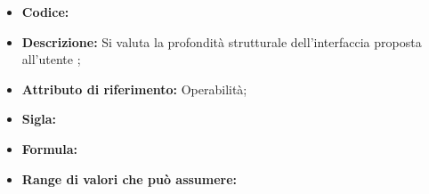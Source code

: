 \begin{itemize}
    \item \textbf{Codice:} 
    \item \textbf{Descrizione:} Si valuta la profondità strutturale dell'interfaccia proposta all'utente ;
    \item \textbf{Attributo di riferimento:} Operabilità;
    \item \textbf{Sigla:}
    \item \textbf{Formula:}
    \item \textbf{Range di valori che può assumere:}
\end{itemize}
